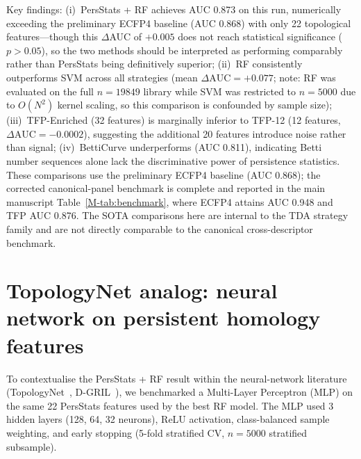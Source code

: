 \documentclass[11pt,a4paper]{article}
\begin{document}
Key findings: (i)~PersStats + RF achieves AUC \num{0.873} on this run, numerically exceeding the preliminary ECFP4 baseline (AUC \num{0.868}) with only 22 topological features---though this $\Delta$AUC of $+\num{0.005}$ does not reach statistical significance ($p > \num{0.05}$), so the two methods should be interpreted as performing comparably rather than PersStats being definitively superior; (ii)~RF consistently outperforms SVM across all strategies (mean $\Delta\text{AUC} = +\num{0.077}$; note: RF was evaluated on the full $n = \num{19849}$ library while SVM was restricted to $n = \num{5000}$ due to $O(N^2)$ kernel scaling, so this comparison is confounded by sample size); (iii)~TFP-Enriched (32 features) is marginally inferior to TFP-12 (12 features, $\Delta\text{AUC} = -\num{0.0002}$), suggesting the additional 20 features introduce noise rather than signal; (iv)~BettiCurve underperforms (AUC \num{0.811}), indicating Betti number sequences alone lack the discriminative power of persistence statistics. These comparisons use the preliminary ECFP4 baseline (AUC \num{0.868}); the corrected canonical-panel benchmark is complete and reported in the main manuscript Table~\ref{M-tab:benchmark}, where ECFP4 attains AUC \num{0.948} and TFP AUC \num{0.876}. The SOTA comparisons here are internal to the TDA strategy family and are not directly comparable to the canonical cross-descriptor benchmark.


\section{TopologyNet analog: neural network on persistent homology features}
\label{sec:topologynet_analog}

To contextualise the PersStats + RF result within the neural-network literature (TopologyNet~\citep{topologynet_2018}, D-GRIL~\citep{dgril_2026}), we benchmarked a Multi-Layer Perceptron (MLP) on the same 22 PersStats features used by the best RF model. The MLP used 3 hidden layers (128, 64, 32 neurons), ReLU activation, class-balanced sample weighting, and early stopping (5-fold stratified CV, $n = \num{5000}$ stratified subsample).
\end{document}
